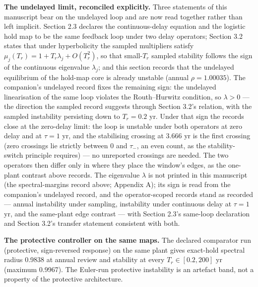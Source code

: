 \documentclass[11pt]{article}
\begin{document}
\textbf{The undelayed limit, reconciled explicitly.} Three statements of
this manuscript bear on the undelayed loop and are now read together
rather than left implicit. Section 2.3 declares the continuous-delay
equation and the logistic hold map to be the same feedback loop under
two delay operators; Section 3.2 states that under hyperbolicity the
sampled multipliers satisfy
\(\mu_j(T_r) = 1 + T_r\lambda_j + O(T_r^2)\), so that small-\(T_r\)
sampled stability follows the sign of the continuous eigenvalue
\(\lambda_j\); and this section records that the undelayed equilibrium
of the hold-map core is already unstable (annual \(\rho = 1.00035\)).
The companion's undelayed record fixes the remaining sign: the undelayed
linearisation of the same loop violates the Routh--Hurwitz condition, so
\(\lambda > 0\) --- the direction the sampled record suggests through
Section 3.2's relation, with the sampled instability persisting down to
\(T_r = 0.2\) yr. Under that sign the records close at the zero-delay
limit: the loop is unstable under both operators at zero delay and at
\(\tau = 1\) yr, and the stabilising crossing at 3.666 yr is the first
crossing (zero crossings lie strictly between \(0\) and \(\tau_-\), an
even count, as the stability-switch principle requires) --- no
unreported crossings are needed. The two operators then differ only in
where they place the window's edges, as the one-plant contrast above
records. The eigenvalue \(\lambda\) is not printed in this manuscript
(the spectral-margins record above; Appendix A); its sign is read from
the companion's undelayed record, and the operator-scoped records stand
as recorded --- annual instability under sampling, instability under
continuous delay at \(\tau = 1\) yr, and the same-plant edge contrast
--- with Section 2.3's same-loop declaration and Section 3.2's transfer
statement consistent with both.

\textbf{The protective controller on the same maps.} The declared
comparator run (protective, sign-reversed response) on the same plant
gives exact-hold spectral radius 0.9838 at annual review and stability
at every \(T_r \in [0.2, 200]\) yr (maximum 0.9967). The Euler-run
protective instability is an artefact band, not a property of the
protective architecture.
\end{document}
